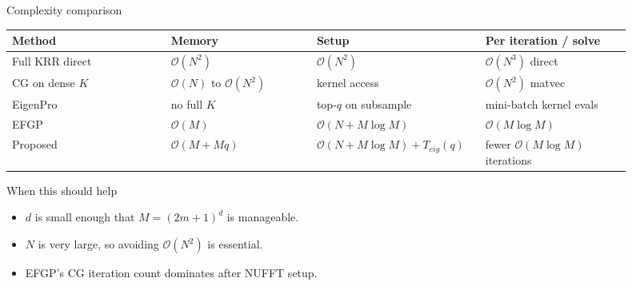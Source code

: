 \documentclass[aspectratio=169,11pt]{ctexbeamer}
\newcommand{\OO}{\mathcal{O}}
\begin{document}
\begin{frame}{Complexity comparison}
\small
\begin{center}
\begin{tabular}{p{0.24\linewidth}p{0.22\linewidth}p{0.22\linewidth}p{0.22\linewidth}}
\toprule
Method & Memory & Setup & Per iteration / solve \\
\midrule
Full KRR direct & $\OO(N^2)$ & $\OO(N^2)$ & $\OO(N^3)$ direct \\
CG on dense $K$ & $\OO(N)$ to $\OO(N^2)$ & kernel access & $\OO(N^2)$ matvec \\
EigenPro & no full $K$ & top-$q$ on subsample & mini-batch kernel evals \\
EFGP & $\OO(M)$ & $\OO(N+M\log M)$ & $\OO(M\log M)$ \\
Proposed & $\OO(M+Mq)$ & $\OO(N+M\log M)+T_{eig}(q)$ & fewer $\OO(M\log M)$ iterations \\
\bottomrule
\end{tabular}
\end{center}
\vspace{0.2cm}
\begin{block}{When this should help}
\begin{itemize}
  \item $d$ is small enough that $M=(2m+1)^d$ is manageable.
  \item $N$ is very large, so avoiding $\OO(N^2)$ is essential.
  \item EFGP's CG iteration count dominates after NUFFT setup.
\end{itemize}
\end{block}
\end{frame}
\end{document}
